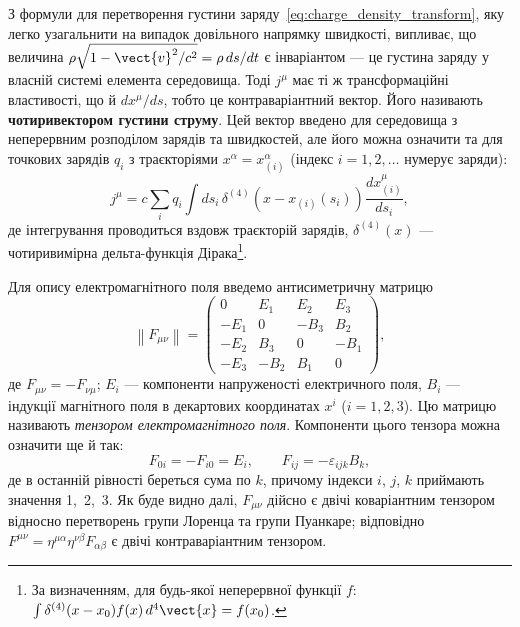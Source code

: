 З формули для перетворення густини заряду~\eqref{eq:charge_density_transform}, яку легко узагальнити на випадок
довільного напрямку швидкості, випливає, що величина $\rho\sqrt{1-\vect{v}^{2}/c^{2}} = \rho\,ds/dt$ є інваріантом ---
це густина заряду у власній системі елемента середовища. Тоді $j^{\mu}$ має ті ж трансформаційні властивості, що й
$dx^{\mu}/ds$, тобто це контраваріантний вектор. Його називають \textbf{чотиривектором густини
    струму}. Цей вектор введено для середовища з неперервним розподілом зарядів та
швидкостей, але його можна означити та для точкових зарядів $q_{i}$ з траєкторіями $x^{\alpha}=x^{\alpha}_{(i)}$ (індекс
$i=1,2,\ldots$ нумерує заряди):
\begin{equation*}
    j^{\mu} = c\sum_{i}q_{i}\int ds_{i}\,\delta^{(4)}(x - x_{(i)}(s_{i}))
    \frac{dx_{(i)}^{\mu}}{ds_{i}},
\end{equation*}
де інтегрування проводиться вздовж траєкторій зарядів, $\delta^{(4)}(x)$ --- чотиривимірна дельта-функція
Дірака\footnote{За визначенням, для будь-якої неперервної функції $f$: $\int\delta^{(4)}(x-x_0)f(x)\,d^4\vect{x} =
        f(x_0)$.}.

Для опису електромагнітного поля введемо антисиметричну матрицю
\begin{equation*}
    \left\| F_{\mu\nu} \right\| =
    \begin{pmatrix}
        0    & E_1  & E_2  & E_3  \\
        -E_1 & 0    & -B_3 & B_2  \\
        -E_2 & B_3  & 0    & -B_1 \\
        -E_3 & -B_2 & B_1  & 0
    \end{pmatrix},
\end{equation*}
де $F_{\mu\nu}=-F_{\nu\mu}$; $E_i$ --- компоненти напруженості електричного поля,
$B_i$ --- індукції магнітного поля в декартових координатах $x^{i}$ ($i=1,2,3$). Цю матрицю називають \emph{тензором
    електромагнітного поля}. Компоненти цього тензора можна означити ще й так:
\begin{equation*}
    F_{0i} = -F_{i0} = E_i, \qquad F_{ij} = -\varepsilon_{ijk}B_k,
\end{equation*}
де в останній рівності береться сума по $k$, причому індекси $i$, $j$, $k$ приймають значення 1,~2,~3. Як буде видно
далі, $F_{\mu\nu}$ дійсно є двічі коваріантним тензором відносно перетворень групи Лоренца та
групи Пуанкаре; відповідно $F^{\mu\nu}=\eta^{\mu\alpha}\eta^{\nu\beta}F_{\alpha\beta}$ є двічі контраваріантним
тензором.

